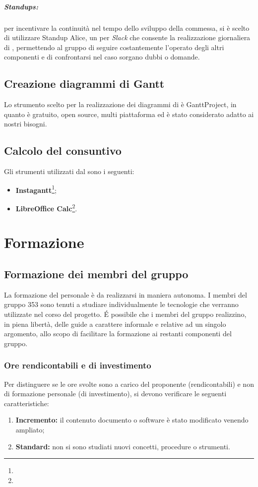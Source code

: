\documentclass[NormeDiProgetto.tex]{subfiles}
\begin{document}
	\subparagraph{Standups:} per incentivare la continuità nel tempo dello sviluppo della commessa, si è scelto di utilizzare Standup Alice, un  per \emph{Slack} che consente la realizzazione giornaliera di , permettendo al gruppo di seguire costantemente l'operato degli altri componenti e di confrontarsi nel caso sorgano dubbi o domande.
	\subsection{Creazione diagrammi di Gantt}
	Lo strumento scelto per	la realizzazione dei diagrammi di  è GanttProject, in quanto è gratuito, open source, multi piattaforma ed è stato considerato adatto ai nostri bisogni.
	\subsection{Calcolo del consuntivo}
	Gli strumenti utilizzati dal \respdiprog{} sono i seguenti:
	\begin{itemize}
		\item \textbf{Instagantt}\footnote{};
		\item \textbf{LibreOffice Calc}\footnote{}.
	\end{itemize}
	
	\section{Formazione}
	\subsection{Formazione dei membri del gruppo}
		La formazione del personale è da realizzarsi in maniera autonoma. I membri del gruppo 353 sono tenuti a studiare individualmente le tecnologie che verranno utilizzate nel corso del progetto. \'{E} possibile che i membri del gruppo realizzino, in piena libertà, delle guide a carattere informale e relative ad un singolo argomento, allo scopo di facilitare la formazione ai restanti componenti del gruppo.
		
	\subsubsection{Ore rendicontabili e di investimento}
	Per distinguere se le ore svolte sono a carico del proponente (rendicontabili) e non di formazione personale (di investimento), si devono verificare le seguenti caratteristiche:
	\begin{enumerate}
		\item \textbf{Incremento:} il contenuto documento o software è stato modificato venendo ampliato;
		\item \textbf{Standard:} non si sono studiati nuovi concetti, procedure o strumenti.
	\end{enumerate}
\end{document}
